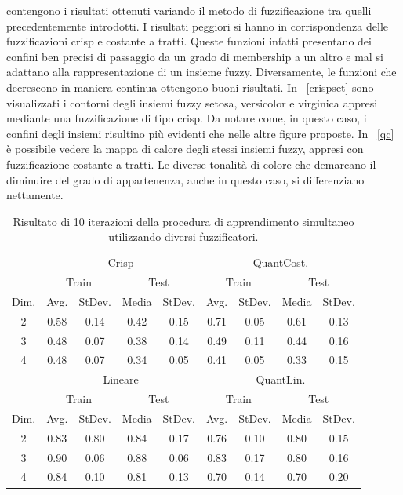 \documentclass [11pt,a4paper,twoside,openright] {book}
\begin{document}
\noindent
contengono i risultati ottenuti variando il metodo di fuzzificazione tra quelli precedentemente introdotti. I risultati peggiori si hanno in corrispondenza delle fuzzificazioni crisp e costante a tratti. Queste funzioni infatti presentano dei confini ben precisi di passaggio da un grado di membership a un altro e mal si adattano alla rappresentazione di un insieme fuzzy. Diversamente, le funzioni che decrescono in maniera continua ottengono buoni risultati. In \figurename~\ref{crispset} sono visualizzati i contorni degli insiemi fuzzy setosa, versicolor e virginica appresi mediante una fuzzificazione di tipo crisp. Da notare come, in questo caso, i confini degli insiemi risultino più evidenti che nelle altre figure proposte. In \figurename~\ref{qc} è possibile vedere la mappa di calore degli stessi insiemi fuzzy, appresi con fuzzificazione costante a tratti. Le diverse tonalità di colore che demarcano il diminuire del grado di appartenenza, anche in questo caso, si differenziano nettamente. 
\begin{table}[H]
\caption{Risultato di 10 iterazioni della procedura di apprendimento simultaneo utilizzando diversi fuzzificatori.\label{df}}
\begin{tabular}{|c|c|c|c|c|c|c|c|c|}
\hline
& \multicolumn{4}{|c|}{Crisp} & \multicolumn{4}{|c|}{QuantCost.}\\
\cline{2-9}
& \multicolumn{2}{|c|}{Train} & \multicolumn{2}{|c|}{Test} & \multicolumn{2}{|c|}{Train} & \multicolumn{2}{|c|}{Test}\\
\hline
Dim. & Avg. & StDev. & Media & StDev. & Avg. & StDev. & Media & StDev. \\
\hline
2 & 0.58 & 0.14 & 0.42 & 0.15 & 0.71 & 0.05 & 0.61 & 0.13 \\
3 & 0.48 & 0.07 & 0.38 & 0.14 & 0.49 & 0.11 & 0.44 & 0.16 \\
4 & 0.48 & 0.07 & 0.34 & 0.05 & 0.41 & 0.05 & 0.33 & 0.15 \\
\hline
\hline
& \multicolumn{4}{|c|}{Lineare} & \multicolumn{4}{|c|}{QuantLin.}\\
\cline{2-9}
& \multicolumn{2}{|c|}{Train} & \multicolumn{2}{|c|}{Test} & \multicolumn{2}{|c|}{Train} & \multicolumn{2}{|c|}{Test}\\
\hline
Dim. & Avg. & StDev. & Media & StDev. & Avg. & StDev. & Media & StDev. \\
\hline
2 & 0.83 & 0.80 & 0.84 & 0.17 & 0.76 & 0.10 & 0.80 & 0.15 \\
3 & 0.90 & 0.06 & 0.88 & 0.06 & 0.83 & 0.17 & 0.80 & 0.16 \\
4 & 0.84 & 0.10 & 0.81 & 0.13 & 0.70 & 0.14 & 0.70 & 0.20 \\
\hline
\end{tabular}
\end{table}
\end{document}

